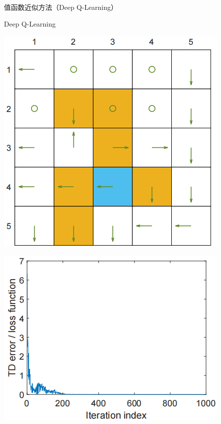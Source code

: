\begin{section}{值函数近似方法\alert{（Deep Q-Learning）}}
\begin{frame}{Deep Q-Learning}
\begin{center}
\begin{minipage}{0.18\textwidth}
        \end{minipage}
        \hspace{1cm}
        \begin{minipage}{0.18\textwidth}
            \centering
            \includegraphics[width=\linewidth]{assets/DQN100policy.png}
        \end{minipage}
    \end{center}
    \begin{center}
        \begin{minipage}{0.22\textwidth}
            \centering
            \includegraphics[width=\linewidth]{assets/DQN100TDerror.png}

\end{minipage}
\end{center}
\end{frame}
\end{section}

